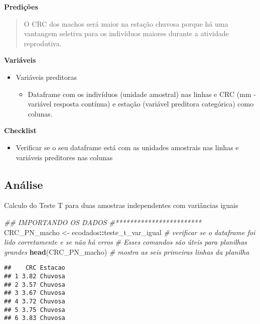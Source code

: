 \documentclass[
]{book}
\newenvironment{Shaded}{\begin{snugshade}}{\end{snugshade}}
\newcommand{\CommentTok}[1]{\textcolor[rgb]{0.56,0.35,0.01}{\textit{#1}}}
\newcommand{\KeywordTok}[1]{\textcolor[rgb]{0.13,0.29,0.53}{\textbf{#1}}}
\newcommand{\NormalTok}[1]{#1}
\newcommand{\OperatorTok}[1]{\textcolor[rgb]{0.81,0.36,0.00}{\textbf{#1}}}
\newcommand{\StringTok}[1]{\textcolor[rgb]{0.31,0.60,0.02}{#1}}
\providecommand{\tightlist}{%
  \setlength{\itemsep}{0pt}\setlength{\parskip}{0pt}}
\begin{document}
\textbf{Predições}

\begin{quote}
O CRC dos machos será maior na estação chuvosa porque há uma vantangem seletiva para os indivíduos maiores durante a atividade reprodutiva.
\end{quote}

\textbf{Variáveis}

\begin{itemize}
\tightlist
\item
  Variáveis preditoras

  \begin{itemize}
  \tightlist
  \item
    Dataframe com os indivíduos (unidade amostral) nas linhas e CRC (mm - variável resposta contínua) e estação (variável preditora categórica) como colunas.
  \end{itemize}
\end{itemize}

\textbf{Checklist}

\begin{itemize}
\tightlist
\item
  Verificar se o seu dataframe está com as unidades amostrais nas linhas e variáveis preditores nas colunas
\end{itemize}

\hypertarget{anuxe1lise}{%
\subsection{Análise}\label{anuxe1lise}}

Calculo do Teste T para duas amostras independentes com variâncias iguais

\begin{Shaded}
\begin{Highlighting}[]
\CommentTok{## IMPORTANDO OS DADOS}
\CommentTok{#************************}
\NormalTok{CRC_PN_macho <-}\StringTok{ }\NormalTok{ecodados}\OperatorTok{::}\NormalTok{teste_t_var_igual}
\CommentTok{# verificar se o dataframe foi lido corretamente e se não há erros}
\CommentTok{# Esses comandos são úteis para planilhas grandes}
\KeywordTok{head}\NormalTok{(CRC_PN_macho) }\CommentTok{# mostra as seis primeiras linhas da planilha}
\end{Highlighting}
\end{Shaded}

\begin{verbatim}
##    CRC Estacao
## 1 3.82 Chuvosa
## 2 3.57 Chuvosa
## 3 3.67 Chuvosa
## 4 3.72 Chuvosa
## 5 3.75 Chuvosa
## 6 3.83 Chuvosa
\end{verbatim}
\end{document}
